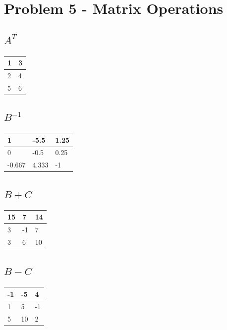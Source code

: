 \documentclass[12pt, letterpaper]{report}
\begin{document}
\section{Problem 5 - Matrix Operations}

\subsection{$A^{T}$}
\begin{center}
	\begin{tabular}{ |l|l| } 
		\hline
		1 & 3 \\
		\hline
		2 & 4 \\
		\hline
		5 & 6 \\
		\hline
	\end{tabular}
\end{center}

\subsection{$B^{-1}$}
\begin{center}
	\begin{tabular}{ |l|l|l| } 
		\hline
		1 & -5.5 & 1.25 \\
		\hline
		0 & -0.5 & 0.25 \\
		\hline
		-0.667 & 4.333 & -1 \\
		\hline
	\end{tabular}
\end{center}

\subsection{$B + C$}
\begin{center}
	\begin{tabular}{ |l|l|l| } 
		\hline
		15 & 7 & 14 \\
		\hline
		3 & -1 & 7 \\
		\hline
		3 & 6 & 10 \\
		\hline
	\end{tabular}
\end{center}

\subsection{$B - C$}
\begin{center}
	\begin{tabular}{ |l|l|l| } 
		\hline
		-1 & -5 & 4 \\
		\hline
		1 & 5 & -1 \\
		\hline
		5 & 10 & 2 \\
		\hline
	\end{tabular}
\end{center}
\end{document}
